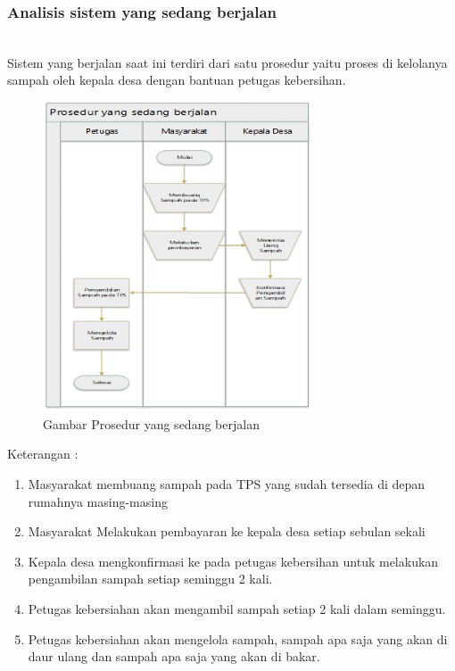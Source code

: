 \subsubsection{Analisis sistem yang sedang berjalan}
\hfill\\
Sistem yang berjalan saat ini terdiri dari satu prosedur yaitu proses di kelolanya sampah oleh kepala desa dengan bantuan petugas kebersihan.
	\begin{figure}[H]
		\includegraphics[width=8cm]{figures/analisis/1.png}
		\centering
		\caption{Gambar Prosedur yang sedang berjalan}
	\end{figure}
Keterangan :
\begin{enumerate}
	\item Masyarakat membuang sampah pada TPS yang sudah tersedia di depan rumahnya masing-masing
	\item Masyarakat Melakukan pembayaran ke kepala desa setiap sebulan sekali
	\item Kepala desa mengkonfirmasi ke pada petugas kebersihan untuk melakukan pengambilan sampah setiap seminggu 2 kali.
	\item Petugas kebersiahan akan mengambil sampah setiap 2 kali dalam seminggu.
	\item Petugas kebersiahan akan mengelola sampah, sampah apa saja yang akan di daur ulang dan sampah apa saja yang akan di bakar.
\end{enumerate}

